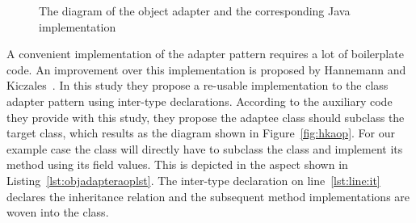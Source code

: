 \begin{figure}
\centering
{}
\hfill
{}
\vfill
{}
\caption{The diagram of the object adapter and the corresponding Java implementation}
\end{figure}

A convenient implementation of the adapter pattern requires a lot of boilerplate code. 
An improvement over this implementation is proposed by  Hannemann and Kiczales~\cite{hannemann:oopsla02}. 
In this study they propose a re-usable implementation to the class adapter pattern using inter-type declarations. 
According to the auxiliary code they provide with this study, they propose the adaptee class should subclass the target class, which results as the diagram shown in Figure~\ref{fig:hkaop}.
For our example case the  class will directly have to subclass the  class and implement its method using its  field values. This is depicted in the aspect shown in Listing~\ref{lst:objadapteraoplst}.
The inter-type declaration on line~\ref{lst:line:it} declares the inheritance relation and the subsequent method implementations are woven into the  class.

